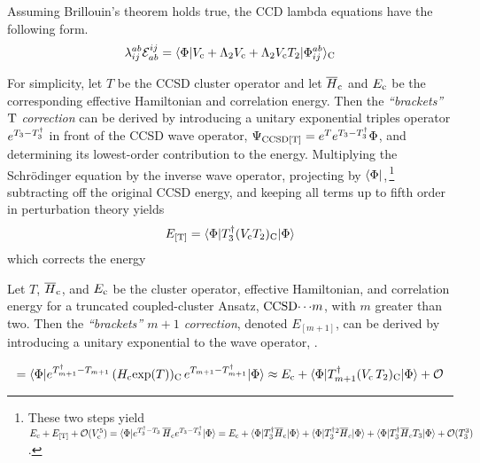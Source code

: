 \documentclass[11pt]{article}
\numberwithin{equation}{section}
\begin{document}
\begin{ex}
Assuming Brillouin's theorem holds true, the CCD lambda equations have the following form.
\begin{align}
  \lambda _{ij}^{ab}
  \mathcal{E}_{ab}^{ij}
=
  \langle\Phi |
    V_{\mathrm{c}}
  +
    \Lambda _2
    V_{\mathrm{c}}
  +
    \Lambda _2 V_{\mathrm{c}}T_2
  |\Phi _{ij}^{ab}\rangle_{\mathrm{C}}
\end{align}
\end{ex}




\newpage

\begin{dfn}
For simplicity, let $T$ be the CCSD cluster operator and let
$\overline{H}_{\mathrm{c}}$
and
$E_{\mathrm{c}}$
be the corresponding effective Hamiltonian and correlation energy.
Then the \textit{``brackets'' $\mathrm{T}$ correction} can be derived by introducing a unitary exponential triples operator $e^{T_3-T_3^\dagger}$ in front of the CCSD wave operator,
$
  \Psi _{\mathrm{CCSD[T]}}
=
  e^T
  e^{T_3 - T_3^\dagger}
  \Phi 
$,
and determining its lowest-order contribution to the energy.
Multiplying the Schr\"odinger equation by the inverse wave operator,
projecting by $\langle\Phi |$,\,\footnote{
These two steps yield
$
  E_{\mathrm{c}}
+
  E_{[\mathrm{T}]}
+
  \mathcal{O}(V_{\mathrm{c}}^5)
=
  \langle\Phi |
  e^{T_3^\dagger - T_3}\,
  \overline{H}_{\mathrm{c}}
  e^{T_3 - T_3^\dagger}
  |\Phi \rangle
=
  E_{\mathrm{c}}
+
  \langle\Phi |T_3^\dagger \overline{H}_{\mathrm{c}}|\Phi \rangle
+
  \langle\Phi |T_3^\dagger{}^2 \overline{H}_c|\Phi \rangle
+
  \langle\Phi |T_3^\dagger \overline{H}_cT_3|\Phi \rangle
+
  \mathcal{O}(T_3^3)
$.
}
subtracting off the original CCSD energy,
and keeping all terms up to fifth order in perturbation theory yields
\begin{align}
  E_{[\mathrm{T}]}
=
  \langle\Phi |
    T_3^\dagger
    (
      V_{\mathrm{c}}
      T_2
    )_{\mathrm{C}}
  |\Phi \rangle
\end{align}
which corrects the energy 
\end{dfn}


\begin{dfn}
Let $T$, $\overline{H}_{\mathrm{c}}$, and $E_{\mathrm{c}}$ be the cluster operator, effective Hamiltonian, and correlation energy for a truncated coupled-cluster Ansatz, $\mathrm{CCSD}{\cdots}m$, with $m$ greater than two.
Then the
\textit{``brackets'' $m+1$ correction}, denoted $E_{[m+1]}$, can be derived by introducing a unitary exponential to the wave operator,
$
$.

\begin{align}
=
  \langle\Phi |
  e^{T_{m+1}^\dagger - T_{m+1}}\,
  (H_{\mathrm{c}}\mathrm{exp}(T))_{\mathrm{C}}\,
  e^{T_{m+1} - T_{m+1}^\dagger}
  |\Phi \rangle
\approx
  E_{\mathrm{c}}
+
  \langle\Phi |
  T_{m+1}^\dagger
  (V_{\mathrm{c}}\,T_2)_{\mathrm{C}}
  |\Phi \rangle
+
  \mathcal{O}
\end{align}

\end{dfn}
\end{document}

